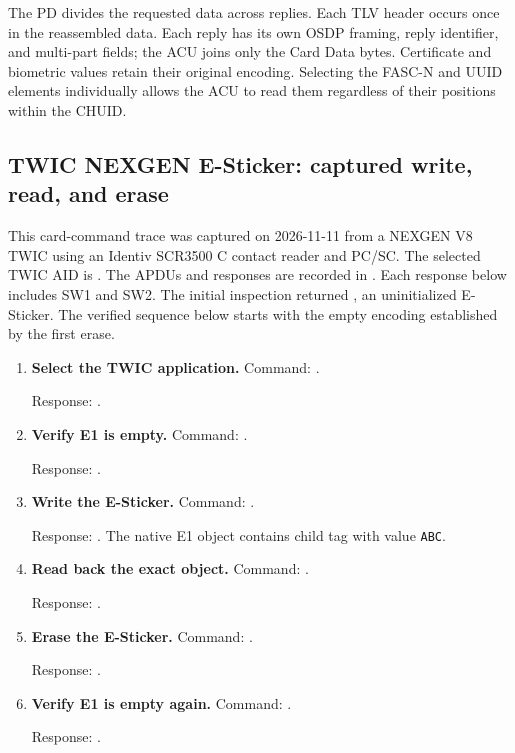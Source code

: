 The PD divides the requested data across replies. Each TLV header occurs once
in the reassembled data. Each reply has its own OSDP framing, reply identifier,
and multi-part fields; the ACU joins only the Card Data bytes.
Certificate and biometric values retain their original encoding.
Selecting the FASC-N and UUID elements individually allows the ACU to read them
regardless of their positions within the CHUID.



\clearpage
\subsection{TWIC NEXGEN E-Sticker: captured write, read, and erase}
\label{ex:twic-esticker-live}

This card-command trace was captured on 2026-11-11 from a NEXGEN V8 TWIC
using an Identiv SCR3500 C contact reader and PC/SC. The selected TWIC AID is
. The APDUs and responses are recorded in
. Each response below includes
SW1 and SW2. The initial inspection returned , an
uninitialized E-Sticker. The verified sequence below starts with the empty
encoding  established by the first erase.

\begin{enumerate}
  \item \textbf{Select the TWIC application.}
    Command: .\par
    Response: .
  \item \textbf{Verify E1 is empty.}
    Command: .\par
    Response: .
  \item \textbf{Write the E-Sticker.}
    Command: .\par
    Response: .
    The native E1 object contains child tag  with value \texttt{ABC}.
  \item \textbf{Read back the exact object.}
    Command: .\par
    Response: .
  \item \textbf{Erase the E-Sticker.}
    Command: .\par
    Response: .
  \item \textbf{Verify E1 is empty again.}
    Command: .\par
    Response: .
\end{enumerate}

